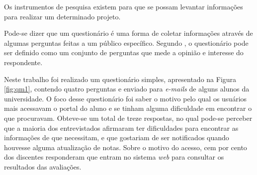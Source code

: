 
	\par Os instrumentos de pesquisa existem para que se possam levantar
informações para realizar um determinado projeto.

	\par Pode-se dizer que um questionário é uma forma de coletar
informações através de algumas perguntas feitas a um público específico.
Segundo , o questionário pode ser definido como
um conjunto de perguntas que mede a opinião e interesse do respondente.

	\par Neste trabalho foi realizado um questionário simples, apresentado na
Figura \ref{fig:qm1}, contendo quatro perguntas e enviado para \textit{e-mails}
de alguns alunos da universidade. O foco desse questionário foi saber o motivo
pelo qual os usuários mais acessavam o portal do aluno e se tinham alguma
dificuldade em encontrar o que procuravam. Obteve-se um total de treze
respostas, no qual pode-se perceber que a maioria dos entrevistados afirmaram
ter dificuldades para encontrar as informações de que necessitam, e que
gostariam de ser notificados quando houvesse alguma atualização de notas. Sobre
o motivo do acesso, cem por cento dos discentes responderam que entram no
sistema \textit{web} para consultar os resultados das avaliações.

